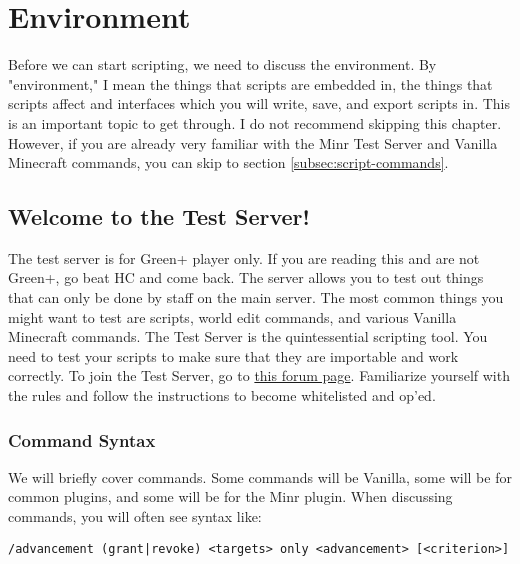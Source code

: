 \documentclass[oneside]{book}
\begin{document}
\hypersetup{linkcolor=black}
\tableofcontents
\hypersetup{linkcolor=blue}

\mainmatter
\pagestyle{plain}

\chapter{Environment}
Before we can start scripting, we need to discuss the environment. By "environment," I mean the things that scripts are embedded in, the things that scripts affect and interfaces which you will write, save, and export scripts in. This is an important topic to get through. I do not recommend skipping this chapter. However, if you are already very familiar with the Minr Test Server and Vanilla Minecraft commands, you can skip to section \ref{subsec:script-commands}.

\section{Welcome to the Test Server!}
The test server is for Green+ player only. If you are reading this and are not Green+, go beat HC and come back. The server allows you to test out things that can only be done by staff on the main server. The most common things you might want to test are scripts, world edit commands, and various Vanilla Minecraft commands. The Test Server is the quintessential scripting tool. You need to test your scripts to make sure that they are importable and work correctly. To join the Test Server, go to \href{https://forums.minr.org/pages/testserver/}{this forum page}. Familiarize yourself with the rules and follow the instructions to become whitelisted and op'ed.

\subsection{Command Syntax}

We will briefly cover commands. Some commands will be Vanilla, some will be for common plugins, and some will be for the Minr plugin. When discussing commands, you will often see syntax like:

\begin{verbatim}
/advancement (grant|revoke) <targets> only <advancement> [<criterion>]
\end{verbatim}
\end{document}
